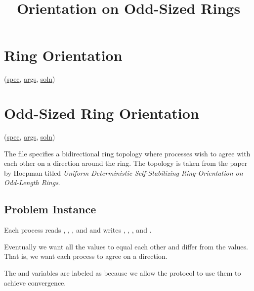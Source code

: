 
\title{Orientation on Odd-Sized Rings}
\date{}



\tableofcontents

\section{Ring Orientation}
\label{sec:OrientRing}

(\href{\examplespec/OrientRing.prot}{spec},
\href{\examplesett/OrientRing.args}{args},
\href{\examplesoln/OrientRing.prot}{soln})

\section{Odd-Sized Ring Orientation}
\label{sec:OrientRingOdd}

(\href{\examplespec/OrientRingOdd.prot}{spec},
\href{\examplesett/OrientRingOdd.args}{args},
\href{\examplesoln/OrientRingOdd.prot}{soln})

The  file specifies a bidirectional ring topology where processes wish to agree with each other on a direction around the ring.
The topology is taken from the paper by Hoepman titled \textit{Uniform Deterministic Self-Stabilizing Ring-Orientation on Odd-Length Rings}.

\subsection{Problem Instance}


Each process  reads , , , and  and writes , , , and .

Eventually we want all the  values to equal each other and differ from the  values.
That is, we want each process to agree on a direction.

The  and  variables are labeled as  because we allow the protocol to use them to achieve convergence.

